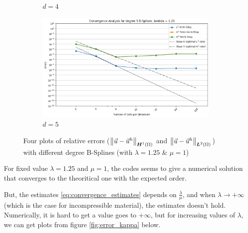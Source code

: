 \documentclass[a4paper,12pt,twoside]{report}
\begin{document}
\begin{figure}[!h]
\begin{subfigure}[b]{0.49\textwidth}
		\caption{$d=4$}
		\label{fig:deg4_NM}
	\end{subfigure}
	\begin{subfigure}[b]{0.49\textwidth}
		\centering
		\includegraphics[width=\textwidth]{figures_non_mixed/convergence_plot_degree_5_lambda=1.25.png}
		\caption{$d=5$}
		\label{fig:deg5_NM}
	\end{subfigure}
	\caption{Four plots of relative errors ($\norm{\vec u - \vec u^h}_{\boldsymbol H^1(\Omega)}$ and $\norm{\vec u - \vec u^h}_{\boldsymbol L^2(\Omega)}$) with different degree B-Splines (with $\lambda = 1.25$  \& $\mu = 1$)}
	\label{fig:four_errors_graphs}
\end{figure}

\newpage 
For fixed value $\lambda = 1.25$ and $\mu = 1$, the codes seems to give a numerical solution that converges to the theoritical one with the expected order. 

But, the estimates \eqref{eq:convergence_estimates} depends on $\frac{\lambda}{\mu}$, and when $\lambda \rightarrow + \infty$ (which is the case for incompressible material), the estimates doesn't hold. Numerically, it is hard to get a value goes to $+\infty$, but for increasing values of $\lambda$, we can get plots from figure \ref{fig:error_kappa} below. 
\end{document}
